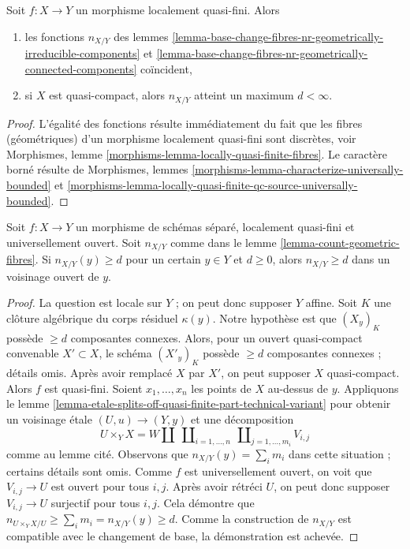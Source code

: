 \begin{lemma}
\label{lemma-count-geometric-fibres}
Soit $f : X \to Y$ un morphisme localement quasi-fini. Alors
\begin{enumerate}
\item les fonctions $n_{X/Y}$ des
lemmes \ref{lemma-base-change-fibres-nr-geometrically-irreducible-components}
et \ref{lemma-base-change-fibres-nr-geometrically-connected-components}
coïncident,
\item si $X$ est quasi-compact, alors $n_{X/Y}$ atteint un maximum $d < \infty$.
\end{enumerate}
\end{lemma}

\begin{proof}
L'égalité des fonctions résulte immédiatement du fait que les
fibres (géométriques) d'un morphisme localement quasi-fini sont discrètes, voir
Morphismes, lemme \ref{morphisms-lemma-locally-quasi-finite-fibres}.
Le caractère borné résulte de
Morphismes, lemmes \ref{morphisms-lemma-characterize-universally-bounded} et
\ref{morphisms-lemma-locally-quasi-finite-qc-source-universally-bounded}.
\end{proof}

\begin{lemma}
\label{lemma-count-geometric-fibres-universally-open}
Soit $f : X \to Y$ un morphisme de schémas séparé, localement quasi-fini et universellement ouvert.
Soit $n_{X/Y}$ comme dans le
lemme \ref{lemma-count-geometric-fibres}.
Si $n_{X/Y}(y) \geq d$ pour un certain $y \in Y$ et $d \geq 0$,
alors $n_{X/Y} \geq d$ dans un voisinage ouvert de $y$.
\end{lemma}

\begin{proof}
La question est locale sur $Y$ ; on peut donc supposer $Y$ affine.
Soit $K$ une clôture algébrique du corps résiduel $\kappa(y)$.
Notre hypothèse est que $(X_y)_K$ possède $\geq d$ composantes connexes.
Alors, pour un ouvert quasi-compact convenable $X' \subset X$,
le schéma $(X'_y)_K$ possède $\geq d$ composantes connexes ; détails omis.
Après avoir remplacé $X$ par $X'$, on peut supposer $X$ quasi-compact.
Alors $f$ est quasi-fini. Soient $x_1, \ldots, x_n$ les points de $X$
au-dessus de $y$. Appliquons le
lemme \ref{lemma-etale-splits-off-quasi-finite-part-technical-variant}
pour obtenir un voisinage \'etale $(U, u) \to (Y, y)$ et une décomposition
$$
U \times_Y X =
W \amalg
\ \coprod\nolimits_{i = 1, \ldots, n}
\ \coprod\nolimits_{j = 1, \ldots, m_i}
V_{i, j}
$$
comme au lemme cité. Observons que $n_{X/Y}(y) = \sum_i m_i$
dans cette situation ; certains détails sont omis.
Comme $f$ est universellement ouvert, on voit
que $V_{i, j} \to U$ est ouvert pour tous $i, j$. Après avoir rétréci
$U$, on peut donc supposer $V_{i, j} \to U$ surjectif
pour tous $i, j$. Cela démontre que
$n_{U \times_Y X/U} \geq \sum_i m_i = n_{X/Y}(y) \geq d$.
Comme la construction de $n_{X/Y}$ est compatible avec le
changement de base, la démonstration est achevée.
\end{proof}

